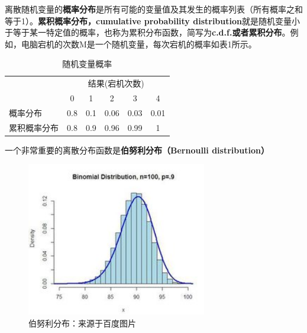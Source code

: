 \documentclass[cn,12pt,math=newtx,citestyle=gb7714-2015,bibstyle=gb7714-2015]{elegantbook}
\begin{document}
	离散随机变量的\textbf{概率分布}是所有可能的变量值及其发生的概率列表（所有概率之和等于1）。\textbf{累积概率分布，cumulative probability distribution}就是随机变量小于等于某一特定值的概率，也称为累积分布函数，简写为\textbf{c.d.f.或者累积分布}。例如，电脑宕机的次数M是一个随机变量，每次宕机的概率如表1所示。
	\begin{center}
		\begin{table}[!h]
			\caption{随机变量概率}\label{tab:digit}
			\begin{center}
				\begin{tabular}{lccccc}
					\hline
					&\multicolumn{5}{c}{结果(宕机次数)}\\
					\cline{2-6}
					&0&1&2&3&4\\
					\cline{1-6}
					概率分布&0.8&0.1&0.06&0.03&0.01\\
					\cline{1-6}
					累积概率分布&0.8&0.9&0.96&0.99&1\\
					\hline
				\end{tabular}
			\end{center}
		\end{table}
	\end{center}
	
	一个非常重要的离散分布函数是\textbf{伯努利分布（Bernoulli distribution）}

\begin{figure}[htbp]
	\centering
	\includegraphics[width=0.7\textwidth]{BF.jpg}
	\caption{伯努利分布：来源于百度图片}
	\label{fig:digit}
\end{figure}
	
\end{document}
